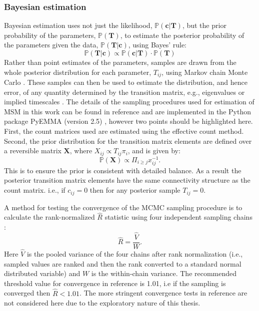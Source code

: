 \subsubsection{Bayesian estimation}\label{sec:theory_bayes}
Bayesian estimation \cite{gelmanBayesianDataAnalysis2014} uses not just the likelihood, $\mathbb{P}(\mathbf{c}|\mathbf{T})$, but the prior probability of the parameters, $\mathbb{P}(\mathbf{T})$, to estimate the posterior probability of the parameters given the data, $\mathbb{P}(\mathbf{T}|\mathbf{c})$, using Bayes' rule: 
\begin{equation}
    \mathbb{P}(\mathbf{T}|\mathbf{c}) \propto \mathbb{P}(\mathbf{c}|\mathbf{T})\cdot\mathbb{P}(\mathbf{T})
\end{equation}
Rather than point estimates of the parameters, samples are drawn from the whole posterior distribution for each parameter, $T_{ij}$, using Markov chain Monte Carlo \cite{gelmanBayesianDataAnalysis2014}. These samples can then be used to estimate the distribution, and hence error, of any quantity determined by the transition matrix, e.g., eigenvalues or implied timescales \cite{gelmanBayesianDataAnalysis2014}. The details of the sampling procedures used for estimation of MSM in this work can be found in reference \cite{trendelkamp-schroerEstimationUncertaintyReversible2015b} and are implemented in the Python package PyEMMA (version 2.5) \cite{schererPyEMMASoftwarePackage2015a}, however two points should be highlighted here. First, the count matrices used are estimated using the effective count method. Second, the prior distribution for the transition matrix elements are defined over a reversible matrix $\mathbf{X}$, where $X_{ij}\propto T_{ij}\pi_{i}$, and is given by: 
\begin{equation}\label{eqn:theory_rev_prior}
    \mathbb{P}(\mathbf{X}) \propto \Pi_{i \ge j}x_{ij}^{-1}. 
\end{equation}
This is to ensure the prior is consistent with detailed balance. As a result the posterior transition matrix elements have the same connectivity structure as the count matrix. i.e., if $c_{ij}=0$ then for any posterior sample $T_{ij}=0$. 

A method for testing the convergence of the MCMC sampling procedure is to calculate the rank-normalized $\hat{R}$ statistic using four independent sampling chains \cite{vehtariRanknormalizationFoldingLocalization2020}:
\begin{equation}
    \hat{R} = \frac{\hat{V}}{W}.
\end{equation}
Here $\hat{V}$ is the pooled variance of the four chains after rank normalization (i.e., sampled values are ranked and then the rank converted to a standard normal distributed variable) and $W$ is the within-chain variance. The recommended threshold value for convergence in reference \cite{vehtariRanknormalizationFoldingLocalization2020} is \num{1.01}, i.e if the sampling is converged then $\widehat{R} < 1.01$. The more stringent convergence tests in reference \cite{vehtariRanknormalizationFoldingLocalization2020} are not considered here due to the exploratory nature of this thesis.   

